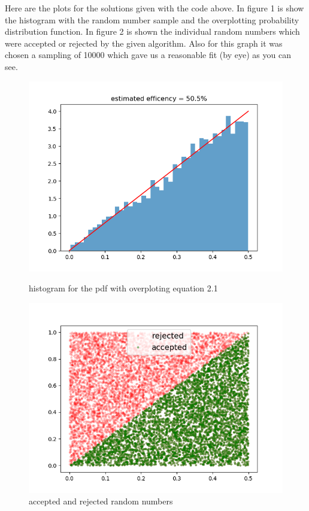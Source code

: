 \documentclass[11pt, a4paper, reqno]{scrartcl}
\begin{document}
     	
     	\begin{figure}[H]
     		
     	\end{figure}

    	Here are the plots for the solutions given with the code above. In figure 1 		is show the histogram with the random number sample and the overplotting 			probability distribution function. In figure 2 is shown the individual 				random numbers which were accepted or rejected by the given algorithm. Also 		for this graph it was chosen a sampling of 10000 which gave us a reasonable 		fit (by eye) as you can see. 
        \begin{figure}
        	\includegraphics[width=0.67\paperwidth]{pdf.png}
            \caption{histogram for the pdf with overploting equation 2.1}
            \includegraphics[width=0.67\paperwidth]{accepted_rejected.png}
            \caption{accepted and rejected random numbers}
        \end{figure}
 
\end{document}

